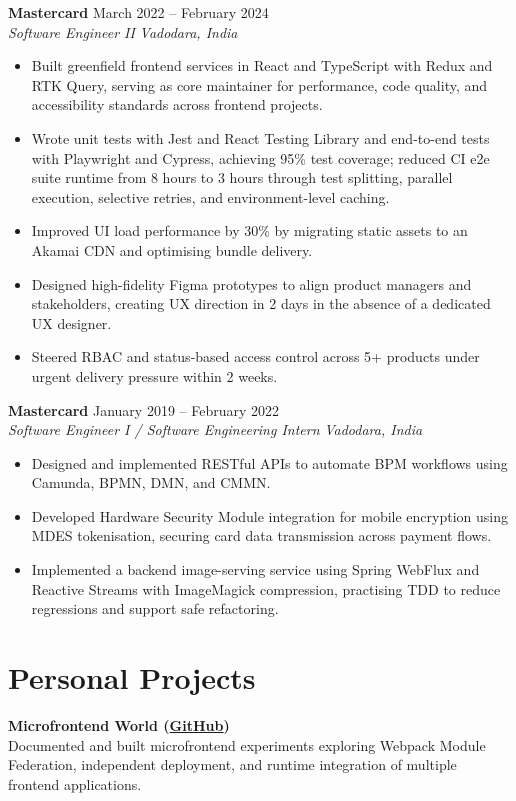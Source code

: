\documentclass[a4paper,10pt]{article}
\newcommand{\role}[4]{
  \textbf{\color{accent}#1} \hfill {\small #2}\\
  \textit{#3} \hfill {\small \textit{#4}}
}
\newcommand{\project}[2]{
  \textbf{\color{accent}#1}\\
  {\small #2}
}
\begin{document}
\role{Mastercard}{March 2022 -- February 2024}{Software Engineer II}{Vadodara, India}
\begin{itemize}
  \item Built greenfield frontend services in React and TypeScript with Redux and RTK Query, serving as core maintainer for performance, code quality, and accessibility standards across frontend projects.
  \item Wrote unit tests with Jest and React Testing Library and end-to-end tests with Playwright and Cypress, achieving 95\% test coverage; reduced CI e2e suite runtime from 8 hours to 3 hours through test splitting, parallel execution, selective retries, and environment-level caching.
  \item Improved UI load performance by 30\% by migrating static assets to an Akamai CDN and optimising bundle delivery.
  \item Designed high-fidelity Figma prototypes to align product managers and stakeholders, creating UX direction in 2 days in the absence of a dedicated UX designer.
  \item Steered RBAC and status-based access control across 5+ products under urgent delivery pressure within 2 weeks.
\end{itemize}

\role{Mastercard}{January 2019 -- February 2022}{Software Engineer I / Software Engineering Intern}{Vadodara, India}
\begin{itemize}
  \item Designed and implemented RESTful APIs to automate BPM workflows using Camunda, BPMN, DMN, and CMMN.
  \item Developed Hardware Security Module integration for mobile encryption using MDES tokenisation, securing card data transmission across payment flows.
  \item Implemented a backend image-serving service using Spring WebFlux and Reactive Streams with ImageMagick compression, practising TDD to reduce regressions and support safe refactoring.
\end{itemize}

\section{Personal Projects}
\project{Microfrontend World \small{(\href{https://github.com/aymanapatel/microfrontend-world}{GitHub})}}{Documented and built microfrontend experiments exploring Webpack Module Federation, independent deployment, and runtime integration of multiple frontend applications.}
\end{document}
